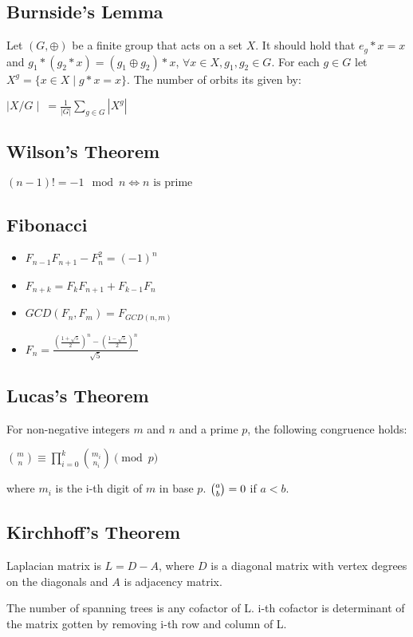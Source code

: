 \documentclass[a4paper,10pt,oneside]{article}
\begin{document}
\begin{multicols}{2}
\subsection{Burnside's Lemma}
Let $(G, \oplus)$ be a finite group that acts on a set $X$. It should hold that $e_g*x=x$ and $g_1 *(g_2 * x) = (g_1 \oplus g_2) * x$, $\forall x \in X, g_1, g_2 \in G$. For each $g \in G$ let $X^g = \{x \in X \mid g*x = x \}$. The number of orbits its given by:

$\mid X / G\mid~= \frac{1}{|G|} \sum_{g \in G}{|X^g|}$

\subsection{Wilson's Theorem}
$(n-1)! = -1 \mod n \iff n\text{ is prime}$

\subsection{Fibonacci}
\begin{itemize}
\item $F_{n-1}F_{n+1} - F_n^2 = (-1)^n$
\item $F_{n+k} = F_kF_{n+1} + F_{k-1}F_n$
\item $GCD(F_n, F_m) = F_{GCD(n, m)}$
\item $F_n = \frac{(\frac{1+\sqrt{5}}{2})^n - (\frac{1-\sqrt{5}}{2})^n}{\sqrt{5}}$
\end{itemize}

\subsection{Lucas's Theorem}
For non-negative integers $m$ and $n$ and a prime $p$, the following congruence holds:

$\displaystyle \binom{m}{n} \equiv \prod_{i = 0}^{k} \binom{m_i}{n_i} \pmod p$

where $m_i$ is the i-th digit of $m$ in base $p$. ${\displaystyle {\tbinom {a}{b}}=0}$ if $a < b$.

\subsection{Kirchhoff's Theorem}
Laplacian matrix is $L = D - A$, where $D$ is a diagonal matrix with vertex degrees on the diagonals and $A$ is adjacency matrix.

The number of spanning trees is any cofactor of L. i-th cofactor is determinant of the matrix gotten by removing i-th row and column of L.


\end{multicols}
\end{document}
